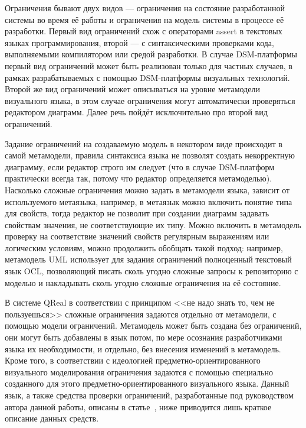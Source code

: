 Ограничения бывают двух видов --- ограничения на состояние разработанной системы во 
время её работы и ограничения на модель системы в процессе её разработки. Первый 
вид ограничений схож с операторами assert в текстовых языках программирования, второй --- 
с синтаксическими проверками кода, выполняемыми компилятором или средой разработки. 
В случае \ac{DSM}-платформы первый вид ограничений может быть реализован только для частных 
случаев, в рамках разрабатываемых с помощью \ac{DSM}-платформы визуальных технологий. Второй 
же вид ограничений может описываться на уровне метамодели визуального языка, в этом 
случае ограничения могут автоматически проверяться редактором диаграмм. Далее речь 
пойдёт исключительно про второй вид ограничений.

Задание ограничений на создаваемую модель в некотором виде происходит в самой метамодели, 
правила синтаксиса языка не позволят создать некорректную диаграмму, если редактор строго 
им следует (что в случае \ac{DSM}-платформ практически всегда так, потому что редактор 
определяется метамоделью). Насколько сложные ограничения можно задать в метамодели 
языка, зависит от используемого метаязыка, например, в метаязык можно включить понятие 
типа для свойств, тогда редактор не позволит при создании диаграмм задавать свойствам 
значения, не соответствующие их типу. Можно включить в метамодель проверку на соответствие 
значений свойств регулярным выражениям или логическим условиям, можно продолжить обобщать 
такой подход: например, метамодель UML использует для задания ограничений полноценный 
текстовый язык OCL, позволяющий писать сколь угодно сложные запросы к репозиторию с 
моделью и накладывать сколь угодно сложные ограничения на её состояние.

В системе QReal в соответствии с принципом <<не надо знать то, чем не пользуешься>> 
сложные ограничения задаются отдельно от метамодели, с помощью модели ограничений. 
Метамодель может быть создана без ограничений, они могут быть добавлены в язык потом,
по мере осознания разработчиками языка их необходимости, и отдельно, без внесения 
изменений в метамодель. Кроме того, в соответствии с идеологией предметно-ориентированного 
визуального моделирования ограничения задаются с помощью специально созданного для 
этого предметно-ориентированного визуального языка. Данный язык, а также средства 
проверки ограничений, разработанные под руководством автора данной работы, 
описаны в статье~\cite{deripaska2013constraints}, ниже приводится лишь краткое описание данных средств.

